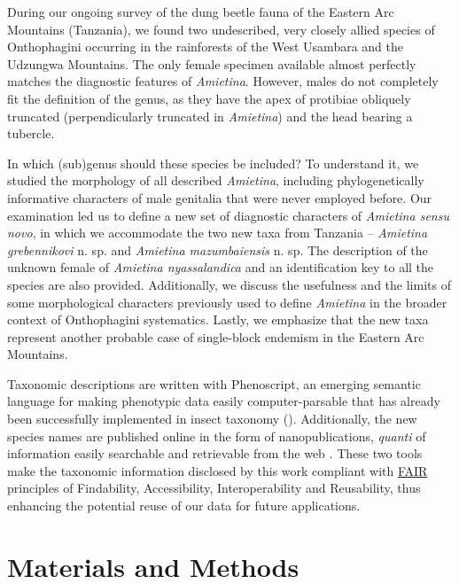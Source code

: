 \documentclass[fleqn,10pt,lineno]{wlpeerj}
\begin{document}
During our ongoing survey of the dung beetle fauna of the Eastern Arc Mountains (Tanzania), we found two undescribed, very closely allied species of Onthophagini occurring in the rainforests of the West Usambara and the Udzungwa Mountains. The only female specimen available almost perfectly matches the diagnostic features of \textit{Amietina}. However, males do not completely fit the definition of the genus, as they have the apex of protibiae obliquely truncated (perpendicularly truncated in \textit{Amietina}) and the head bearing a tubercle.

In which (sub)genus should these species be included? To understand it, we studied the morphology of all described \textit{Amietina}, including phylogenetically informative characters of male genitalia that were never employed before. Our examination led us to define a new set of diagnostic characters of \textit{Amietina sensu novo}, in which we accommodate the two new taxa from Tanzania -- \textit{Amietina grebennikovi} n. sp. and \textit{Amietina mazumbaiensis} n. sp. The description of the unknown female of \textit{Amietina nyassalandica} and an identification key to all the species are also provided. Additionally, we discuss the usefulness and the limits of some morphological characters previously used to define \textit{Amietina} in the broader context of Onthophagini systematics.  Lastly, we emphasize that the new taxa represent another probable case of single-block endemism in the Eastern Arc Mountains.

Taxonomic descriptions are written with Phenoscript, an emerging semantic language for making phenotypic data easily computer-parsable that has already been successfully implemented in insect taxonomy (\citealp{miko2021semantically, montanaro2024beyond, montanaro2024computable}). Additionally, the new species names are published online in the form of nanopublications, \textit{quanti} of information easily searchable and retrievable from the web \citep{kuhn2013broadening, montanaro2024beyond}. These two tools make the taxonomic information disclosed by this work compliant with \href{https://www.go-fair.org/fair-principles/}{FAIR} principles of Findability, Accessibility, Interoperability and Reusability, thus enhancing the potential reuse of our data for future applications.

\section*{Materials and Methods}
\end{document}
